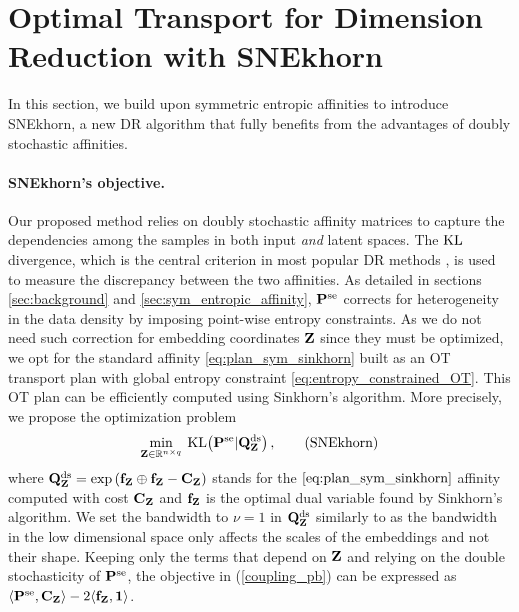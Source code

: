 
\section{Optimal Transport for Dimension Reduction with SNEkhorn}\label{sec:DR_with_OT}

In this section, we build upon symmetric entropic affinities to introduce SNEkhorn, a new DR algorithm that fully benefits from the advantages of doubly stochastic affinities.

\paragraph{SNEkhorn's objective.} Our proposed method relies on doubly stochastic affinity matrices to capture the dependencies among the samples in both input \emph{and} latent spaces. The $\operatorname{KL}$ divergence, which is the central criterion in most popular DR methods \cite{van2022probabilistic}, is used to measure the discrepancy between the two affinities. As detailed in sections \ref{sec:background} and \ref{sec:sym_entropic_affinity}, $\mathbf{P}^{\mathrm{se}}$ corrects for heterogeneity in the
data density by imposing point-wise entropy constraints. As we do not need such correction for embedding coordinates $\mathbf{Z}$ since they must be optimized, we opt for the standard affinity \eqref{eq:plan_sym_sinkhorn} built as an OT transport plan with global entropy constraint \eqref{eq:entropy_constrained_OT}. This OT plan can be efficiently computed using Sinkhorn's algorithm. More precisely, 
we propose the optimization problem
\begin{align}\label{coupling_pb}
    \min_{\mathbf{Z} \in \mathbb{R}^{n \times q}} \:  \mathrm{KL}\big(\mathbf{P}^{\mathrm{se}} | \mathbf{Q}^{\mathrm{ds}}_{\mathbf{Z}} \big)\,,
\tag{SNEkhorn}
\end{align}
where $\mathbf{Q}^{\mathrm{ds}}_{\mathbf{Z}} = \exp \left(\mathbf{f}_{\mathbf{Z}} \oplus \mathbf{f}_{\mathbf{Z}} - \mathbf{C}_{\mathbf{Z}} \right)$ stands for the $\eqref{eq:plan_sym_sinkhorn}$ affinity computed with cost $\mathbf{C}_{\mathbf{Z}}$ and $\mathbf{f}_{\mathbf{Z}}$ is the optimal dual variable found by Sinkhorn's algorithm.
We set the bandwidth to $\nu = 1$ in $\mathbf{Q}^{\mathrm{ds}}_{\mathbf{Z}}$ similarly to \cite{van2008visualizing} as the bandwidth in the low dimensional space only affects the scales of the embeddings and not their shape.
Keeping only the terms that depend on $\mathbf{Z}$ and relying on the double stochasticity of $\mathbf{P}^{\mathrm{se}}$, the objective in (\ref{coupling_pb}) can be expressed as $\langle \mathbf{P}^{\mathrm{se}}, \mathbf{C}_{\mathbf{Z}} \rangle - 2 \langle \mathbf{f}_{\mathbf{Z}}, \bm{1} \rangle$. %

